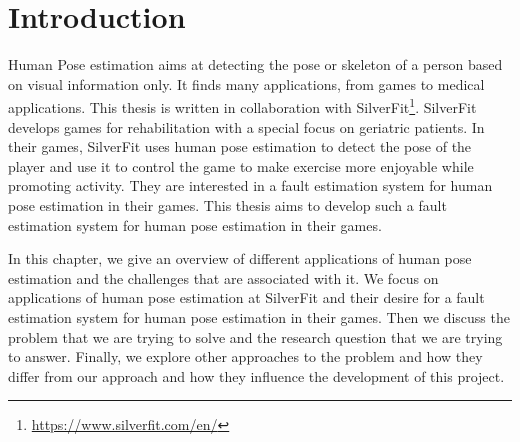 \chapter{Introduction}
\setcounter{page}{1}

Human Pose estimation aims at detecting the pose or skeleton of a person based on visual information only. It finds many applications, from games to medical applications. This thesis is written in collaboration with SilverFit\footnote{\url{https://www.silverfit.com/en/}}. SilverFit develops games for rehabilitation with a special focus on geriatric patients. In their games, SilverFit uses human pose estimation to detect the pose of the player and use it to control the game to make exercise more enjoyable while promoting activity. They are interested in a fault estimation system for human pose estimation in their games. This thesis aims to develop such a fault estimation system for human pose estimation in their games.

In this chapter, we give an overview of different applications of human pose estimation and the challenges that are associated with it. We focus on applications of human pose estimation at SilverFit and their desire for a fault estimation system for human pose estimation in their games. Then we discuss the problem that we are trying to solve and the research question that we are trying to answer. Finally, we explore other approaches to the problem and how they differ from our approach and how they influence the development of this project.





